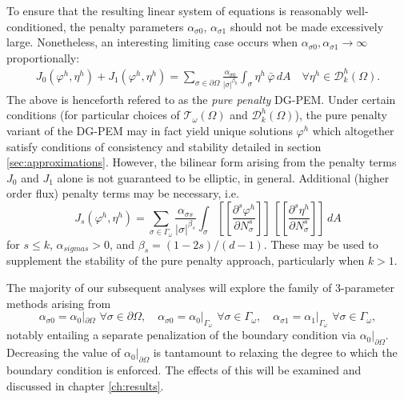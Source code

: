 	To ensure that the resulting linear system of equations is reasonably well-conditioned, the penalty parameters $\alpha_{\sigma0}$, $\alpha_{\sigma1}$ should not be made excessively large. Nonetheless, an interesting limiting case occurs when $\alpha_{\sigma0}, \alpha_{\sigma1} \rightarrow \infty$ proportionally:
	\begin{eqnarray}
		J_0 (\varphi^h,\eta^h) + J_1 (\varphi^h,\eta^h) = \sum_{\sigma \in \partial \Omega} \frac{\alpha_{\sigma0}}{|\sigma|^{\beta_0}} \int_{\sigma} \eta^h \,  \bar{\varphi} \, dA \quad \forall \eta^h \in \mathcal{D}^h_k (\Omega).
		\label{eq:pure_penalty}
	\end{eqnarray}
	The above is henceforth refered to as the \textit{pure penalty} DG-PEM. Under certain conditions (for particular choices of $\mathcal{T}_\omega (\Omega)$ and $\mathcal{D}^h_k (\Omega)$), the pure penalty variant of the DG-PEM may in fact yield unique solutions $\varphi^h$ which altogether satisfy conditions of consistency and stability detailed in section \ref{sec:approximations}. However, the bilinear form arising from the penalty terms $J_0$ and $J_1$ alone is not guaranteed to be elliptic, in general. Additional (higher order flux) penalty terms may be necessary, i.e.
	\begin{equation}
		J_s (\varphi^h,\eta^h) = \sum_{\sigma \in \Gamma_\omega} \frac{\alpha_{\sigma s}}{|\sigma|^{\beta_s}} \int_{\sigma} \left[\!\!\left[ \frac{\partial^s \varphi^h}{\partial N^s_{\sigma}} \right]\!\!\right] \, \left[\!\!\left[ \frac{\partial^s \eta^h}{\partial N^s_{\sigma}} \right]\!\!\right] \, dA
		\label{eq:flux_penalty}
	\end{equation}
	for $s \leq k$, $\alpha_{sigma s} > 0$, and $\beta_s = (1-2s)/(d-1)$. These may be used to supplement the stability of the pure penalty approach, particularly when $k > 1$.
	
	The majority of our subsequent analyses will explore the family of 3-parameter methods arising from
	\begin{equation}
		\alpha_{\sigma 0} = \alpha_{0}|_{\partial \Omega} \, \, \forall \sigma \in \partial \Omega, \quad \alpha_{\sigma 0} = \alpha_{0}|_{\Gamma_{\omega}} \, \, \forall \sigma \in \Gamma_{\omega}, \quad \alpha_{\sigma 1} = \alpha_{1}|_{\Gamma_{\omega}} \, \, \forall \sigma \in \Gamma_{\omega},
	\end{equation}
	notably entailing a separate penalization of the boundary condition via $\alpha_{0}|_{\partial \Omega}$. Decreasing the value of $\alpha_{0}|_{\partial \Omega}$ is tantamount to relaxing the degree to which the boundary condition is enforced. The effects of this will be examined and discussed in chapter \ref{ch:results}.
	
